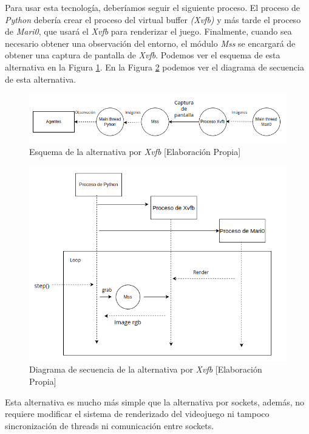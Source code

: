 Para usar esta tecnología, deberíamos seguir el siguiente proceso. El proceso de \textit{Python} debería crear el proceso del virtual buffer \textit{(Xvfb)} y más tarde el proceso de \textit{Mari0}, que usará el \textit{Xvfb} para renderizar el juego. Finalmente, cuando sea necesario obtener una observación del entorno, el módulo \textit{Mss} se encargará de obtener una captura de pantalla de \textit{Xvfb}. Podemos ver el esquema de esta alternativa en la Figura \ref{fig:alternativa-2-com}. En la Figura \ref {fig:alternativa-2-seq} podemos ver el diagrama de secuencia de esta alternativa.
\begin{figure}[ht]
    \centering
    \includegraphics[width=1.0\textwidth]{img/Obsertavions-2.png}
    \caption{Esquema de la alternativa por \textit{Xvfb} [Elaboración Propia]}
    \label{fig:alternativa-2-com}
\end{figure}
\begin{figure}[ht]
    \centering
    \includegraphics[width=1.0\textwidth]{img/obsevation_sequence.png}
    \caption{Diagrama de secuencia de la alternativa por \textit{Xvfb} [Elaboración Propia]}
    \label{fig:alternativa-2-seq}
\end{figure}

Esta alternativa es mucho más simple que la alternativa por sockets, además, no requiere modificar el sistema de renderizado del videojuego ni tampoco sincronización de threads ni comunicación entre sockets. 


